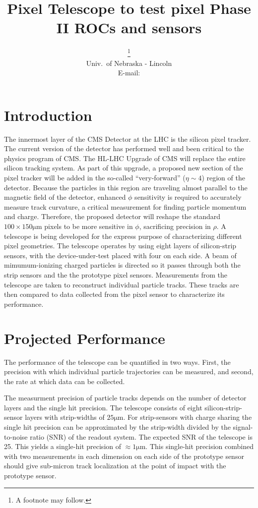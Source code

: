 \documentclass{PoS}
\title{Pixel Telescope to test pixel Phase II ROCs and sensors}
\author{\speaker{Caleb Fangmeier}\thanks{A footnote may follow.}\\
  Univ.\ of Nebraska \-- Lincoln\\
  E-mail: \email{cfangmei@cern.ch}}
\newcommand{\micron}{\si{\micro\meter}}
\begin{document}
\section{Introduction}

The innermost layer of the CMS Detector at the LHC is the silicon pixel
tracker. The current version of the detector has performed well and been
critical to the physics program of CMS\@.  The HL-LHC Upgrade of CMS will
replace the entire silicon tracking system.  As part of this upgrade, a
proposed new section of the pixel tracker will be added in the so-called
``very-forward'' ($\eta\sim4$) region of the detector. Because the particles in
this region are traveling almost parallel to the magnetic field of the
detector, enhanced $\phi$ sensitivity is required to accurately measure track
curvature, a critical measurement for finding particle momentum and charge.
Therefore, the proposed detector will reshape the standard
$100\times150\micron$ pixels to be more sensitive in $\phi$, sacrificing
precision in $\rho$. A telescope is being developed for the express purpose of
characterizing different pixel geometries.  The telescope operates by using
eight layers of silicon-strip sensors, with the device-under-test placed with
four on each side. A beam of mimumum-ionizing charged particles is directed so
it passes through both the strip sensors and the the prototype pixel sensors.
Measurements from the telescope are taken to reconstruct individual particle
tracks. These tracks are then compared to data collected from the pixel sensor
to characterize its performance.

\section{Projected Performance}
The performance of the telescope can be quantified in two ways. First, the
precision with which individual particle trajectories can be measured, and
second, the rate at which data can be collected. 

The measurment precision of particle tracks depends on the number of detector
layers and the single hit precision. The telescope consists of eight
silicon-strip-sensor layers with strip-widths of $25\micron$. For strip-sensors
with charge sharing the single hit precision can be approximated by the
strip-width divided by the signal-to-noise ratio (SNR) of the readout system.
The expected SNR of the telescope is 25. This yields a single-hit precision of
$\approx1\micron$. This single-hit precision combined with two measurements in
each dimension on each side of the prototype sensor should give sub-micron
track localization at the point of impact with the prototype sensor.
\end{document}
